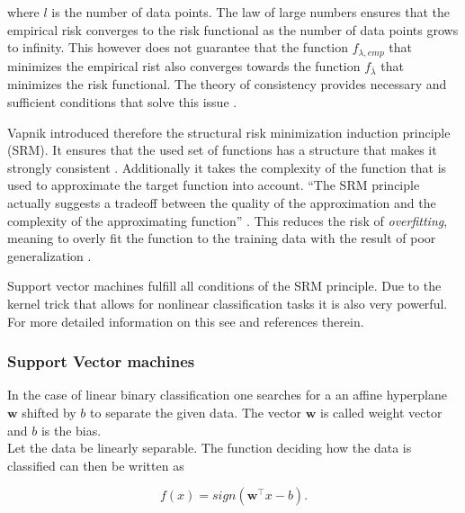 where \(l\) is the number of data points.
The law of large numbers ensures that the empirical risk converges to the risk functional as the number of data points grows to infinity. This however does not guarantee that the function \(f_{\lambda,emp}\) that minimizes the empirical rist also converges towards the function \(f_{\bar{\lambda}}\) that minimizes the risk functional.
The theory of consistency provides necessary and sufficient conditions that solve this issue \cite{Vapnik1999}.

Vapnik introduced therefore the structural risk minimization induction principle (SRM). It ensures that the used set of functions has a structure that makes it strongly consistent \cite{Vapnik1999}. Additionally it takes the complexity of the function that is used to approximate the target function into account. ``The SRM principle actually suggests a tradeoff between the quality of the approximation and the complexity of the approximating function'' \cite[p. 994]{Vapnik1999}.
This reduces the risk of \emph{overfitting}, meaning to overly fit the function to the training data with the result of poor generalization \cite{Cristianini2000}.


Support vector machines fulfill all conditions of the SRM principle. Due to the kernel trick that allows for nonlinear classification tasks it is also very powerful. For more detailed information on this see \cite{Kunapuli2008, Vapnik1998} and references therein.

\subsubsection{Support Vector machines}

In the case of linear binary classification one searches for a an affine hyperplane \(\bm{w}\) shifted by \(b\) to separate the given data. The vector \(\bm{w}\) is called weight vector and \(b\) is the bias. \\
Let the data be linearly separable. The function deciding how the data is classified can then be written as

\[ f(x) = sign(\bm{w}^{\top}x-b). \]


